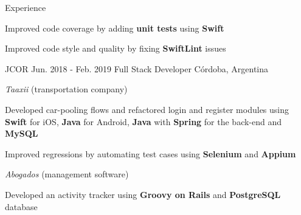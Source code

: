\documentclass{curriculum}
\begin{document}
\begin{cvsection}{Experience}
        \begin{sectionitemlist}
        \item{Improved code coverage by adding \textbf{unit tests} using \textbf{Swift}}
        \item{Improved code style and quality by fixing \textbf{SwiftLint} issues}
        \end{sectionitemlist}


    \makesectionitemheader
        {JCOR}                                              {Jun. 2018 - Feb. 2019}
        {Full Stack Developer}                                 {Córdoba, Argentina}

        \begin{sectionitemlist}

        \item{\textit{Taaxii} (transportation company)}
            \begin{sectionitemlist}
            \item{
                Developed car-pooling flows and refactored login and register
                modules using \textbf{Swift} for iOS, \textbf{Java} for Android,
                \textbf{Java} with \textbf{Spring} for the back-end and \textbf{MySQL}
            }
            \item{
                Improved regressions by automating test cases
                using \textbf{Selenium} and \textbf{Appium}
            }
            \end{sectionitemlist}

        \item{\textit{Abogados} (management software)}
            \begin{sectionitemlist}
            \item{
                Developed an activity tracker using
                \textbf{Groovy on Rails} and \textbf{PostgreSQL} database
            }
            \end{sectionitemlist}

        \end{sectionitemlist}



\end{cvsection}
\end{document}
